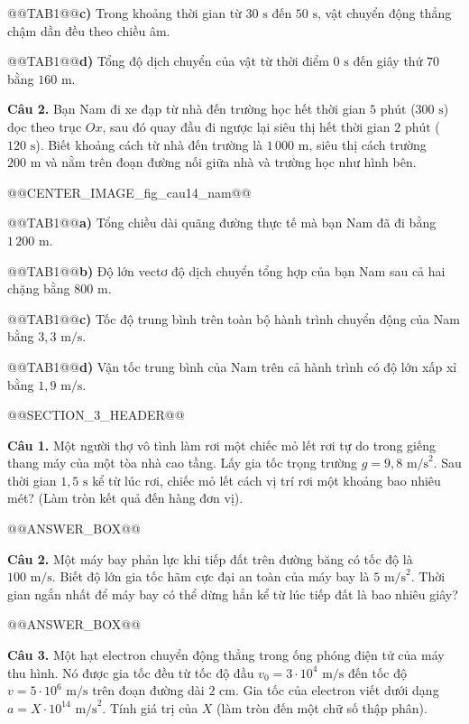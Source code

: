 \documentclass{article}
\begin{document}
@@TAB1@@\textbf{c)} Trong khoảng thời gian từ $30\text{ s}$ đến $50\text{ s}$, vật chuyển động thẳng chậm dần đều theo chiều âm.

@@TAB1@@\textbf{d)} Tổng độ dịch chuyển của vật từ thời điểm $0\text{ s}$ đến giây thứ $70$ bằng $160\text{ m}$.

\textbf{Câu 2.} Bạn Nam đi xe đạp từ nhà đến trường học hết thời gian $5\text{ phút}$ ($300\text{ s}$) dọc theo trục $Ox$, sau đó quay đầu đi ngược lại siêu thị hết thời gian $2\text{ phút}$ ($120\text{ s}$). Biết khoảng cách từ nhà đến trường là $1\,000\text{ m}$, siêu thị cách trường $200\text{ m}$ và nằm trên đoạn đường nối giữa nhà và trường học như hình bên.

@@CENTER_IMAGE_fig_cau14_nam@@

@@TAB1@@\textbf{a)} Tổng chiều dài quãng đường thực tế mà bạn Nam đã đi bằng $1\,200\text{ m}$.

@@TAB1@@\textbf{b)} Độ lớn vectơ độ dịch chuyển tổng hợp của bạn Nam sau cả hai chặng bằng $800\text{ m}$.

@@TAB1@@\textbf{c)} Tốc độ trung bình trên toàn bộ hành trình chuyển động của Nam bằng $3{,}3\text{ m/s}$.

@@TAB1@@\textbf{d)} Vận tốc trung bình của Nam trên cả hành trình có độ lớn xấp xỉ bằng $1{,}9\text{ m/s}$.

@@SECTION_3_HEADER@@

\textbf{Câu 1.} Một người thợ vô tình làm rơi một chiếc mỏ lết rơi tự do trong giếng thang máy của một tòa nhà cao tầng. Lấy gia tốc trọng trường $g = 9{,}8\text{ m/s}^2$. Sau thời gian $1{,}5\text{ s}$ kể từ lúc rơi, chiếc mỏ lết cách vị trí rơi một khoảng bao nhiêu mét? (Làm tròn kết quả đến hàng đơn vị).

@@ANSWER_BOX@@

\textbf{Câu 2.} Một máy bay phản lực khi tiếp đất trên đường băng có tốc độ là $100\text{ m/s}$. Biết độ lớn gia tốc hãm cực đại an toàn của máy bay là $5\text{ m/s}^2$. Thời gian ngắn nhất để máy bay có thể dừng hẳn kể từ lúc tiếp đất là bao nhiêu giây?

@@ANSWER_BOX@@

\textbf{Câu 3.} Một hạt electron chuyển động thẳng trong ống phóng điện tử của máy thu hình. Nó được gia tốc đều từ tốc độ đầu $v_0 = 3 \cdot 10^4\text{ m/s}$ đến tốc độ $v = 5 \cdot 10^6\text{ m/s}$ trên đoạn đường dài $2\text{ cm}$. Gia tốc của electron viết dưới dạng $a = X \cdot 10^{14}\text{ m/s}^2$. Tính giá trị của $X$ (làm tròn đến một chữ số thập phân).
\end{document}
